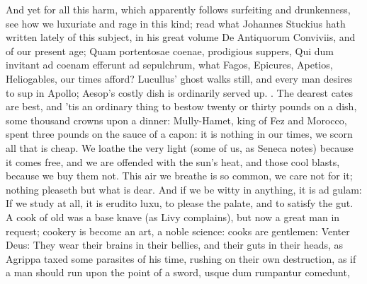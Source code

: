 {{And yet for all this harm, which apparently follows surfeiting and
drunkenness, see how we luxuriate and rage in this kind; read what
Johannes Stuckius hath written lately of this subject, in his great
volume De Antiquorum Conviviis, and of our present age; Quam
portentosae coenae, prodigious suppers, Qui dum invitant ad
coenam efferunt ad sepulchrum, what Fagos, Epicures, Apetios,
Heliogables, our times afford? Lucullus' ghost walks still, and every
man desires to sup in Apollo; Aesop's costly dish is ordinarily served
up. . The dearest cates are
best, and 'tis an ordinary thing to bestow twenty or thirty pounds on a
dish, some thousand crowns upon a dinner: Mully-Hamet, king of
Fez and Morocco, spent three pounds on the sauce of a capon: it is
nothing in our times, we scorn all that is cheap. We loathe the very
light (some of us, as Seneca notes) because it comes free, and we
are offended with the sun's heat, and those cool blasts, because we buy
them not. This air we breathe is so common, we care not for it; nothing
pleaseth but what is dear. And if we be witty in anything, it is
ad gulam: If we study at all, it is erudito luxu, to please the palate,
and to satisfy the gut. A cook of old was a base knave (as Livy
complains), but now a great man in request; cookery is become an art, a
noble science: cooks are gentlemen: Venter Deus: They wear their brains
in their bellies, and their guts in their heads, as Agrippa taxed
some parasites of his time, rushing on their own destruction, as if a
man should run upon the point of a sword, usque dum rumpantur comedunt,

}}
